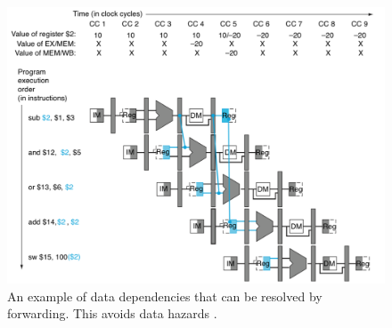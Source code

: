 \begin{figure}[h]
\centering 
\includegraphics[width=6in]{./pics/pipelined-processor-forwarding}
\caption{An example of data dependencies that can be resolved by forwarding. This avoids data hazards \cite{Patterson2012}.}
\label{fig:pipelinedprocessorforwarding}
\end{figure}

